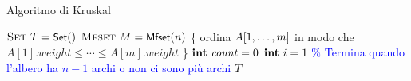 \begin{frame}{Algoritmo di Kruskal}
	
\vspace{-12pt}
\begin{Procedure}
\caption[A]{\Set\ \kruskal($\textsc{edge}[\,]\ A,\ \INTEGER\ n,\ \INTEGER\ m$)}

$\textsc{Set}\ T = \textsf{{\small Set}}()$\;
$\textsc{Mfset}\ M = \textsf{{\small Mfset}}(n)$\;
\{ ordina $A[1, \ldots, m]$ in modo che $A[1].\mathit{weight} \le \cdots \le A[m].\mathit{weight}$ \}\;
$\INTEGER\ \mathit{count} = 0$\;
$\INTEGER\ i = 1$\;
\textcolor{blue}{\% Termina quando l'albero ha $n-1$ archi o non ci sono più archi}\;
\Return $T$\;
\end{Procedure}

\end{frame}

